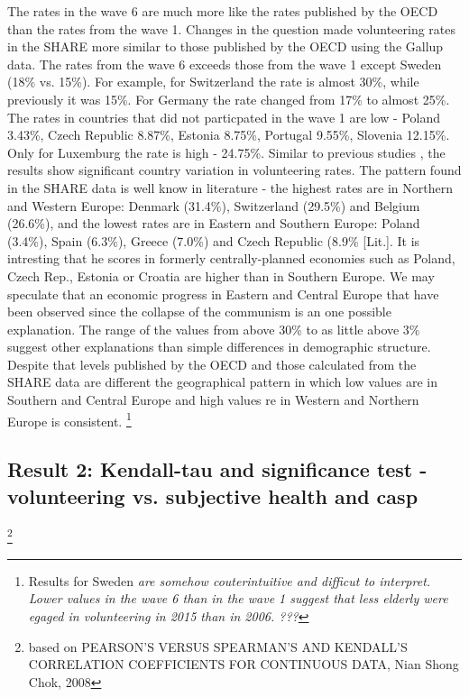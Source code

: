 \documentclass[10pt, letterpaper]{article}
\begin{document}
\begin{spacing}{1.4}
The rates in the wave 6 are much more like the rates published by the OECD than the rates from the wave 1. Changes in the question made volunteering rates in the SHARE more similar to those published by the OECD using the Gallup data. The rates from the wave 6 exceeds those from the wave 1 except Sweden (18\% vs. 15\%).  For example, for Switzerland the rate is almost 30\%, while previously it was 15\%. For Germany the rate changed from 17\% to almost 25\%. The rates in countries that did not particpated in the wave 1 are low - Poland 3.43\%, Czech Republic 8.87\%, Estonia 8.75\%, Portugal 9.55\%, Slovenia 12.15\%. Only for Luxemburg the rate is high - 24.75\%. Similar to previous studies , the results show significant country variation in volunteering rates. The pattern found in the SHARE data is well know in literature - the highest rates are in Northern and Western Europe:  Denmark (31.4\%), Switzerland (29.5\%) and Belgium (26.6\%), and the lowest rates are in Eastern and Southern Europe: Poland (3.4\%), Spain (6.3\%), Greece (7.0\%) and Czech Republic (8.9\% [Lit.]. It is intresting that he scores in formerly centrally-planned economies such as Poland, Czech Rep., Estonia or Croatia are higher than in Southern Europe. We may speculate that an economic progress in Eastern and Central Europe that have been observed since the collapse of the communism is an one possible explanation. The range of the values from above 30\% to as little above 3\% suggest other explanations than simple differences in demographic structure.   Despite that levels published by the OECD and those calculated from the SHARE data are different the geographical pattern in which low values are in Southern and Central Europe and high values re in  Western and Northern Europe is consistent. \footnote{Results for Sweden \textit{are somehow couterintuitive and difficut to interpret. Lower values in the wave 6 than in the wave 1 suggest that less elderly were egaged in volunteering in 2015 than in 2006. ??? }} \\



\subsection{Result 2: Kendall-tau and significance test - volunteering vs. subjective health and casp}

\footnote{based on PEARSON'S VERSUS SPEARMAN'S AND KENDALL'S CORRELATION COEFFICIENTS FOR CONTINUOUS DATA, Nian Shong Chok, 2008}


\end{spacing}
\end{document}
